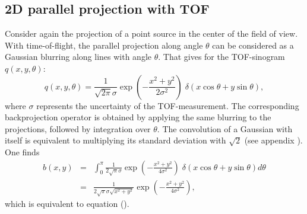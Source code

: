 \subsection{2D parallel projection with TOF}
Consider again the projection of a point source in the center of the
field of view. With time-of-flight, the parallel projection along
angle $\theta$ can be considered as a Gaussian blurring along lines
with angle $\theta$. That gives for the TOF-sinogram $q(x,y,\theta)$:
\begin{equation}
 q(x,y,\theta) = \frac{1}{\sqrt{2\pi}\sigma}
               \exp(-\frac{x^2+y^2}{2 \sigma^2}) \;
              \delta(x\cos\theta + y\sin\theta),
\end{equation}
where $\sigma$ represents the uncertainty of the TOF-measurement. The
corresponding backprojection operator is obtained by applying the same
blurring to the projections, followed by integration over
$\theta$. The convolution of a Gaussian with itself is equivalent to
multiplying its standard deviation with $\sqrt{2}$ (see appendix
). One finds
\begin{eqnarray}
  b(x,y) & = & \int_0^\pi \frac{1}{2\sqrt{\pi}\sigma}
               \exp(-\frac{x^2+y^2}{4 \sigma^2}) \;
              \delta(x\cos\theta + y\sin\theta) d\theta\\
 &=& \frac{1}{2\sqrt{\pi}\sigma \sqrt{x^2 + y^2}}
               \exp(-\frac{x^2+y^2}{4 \sigma^2}),
\end{eqnarray}
which is equivalent to equation ().